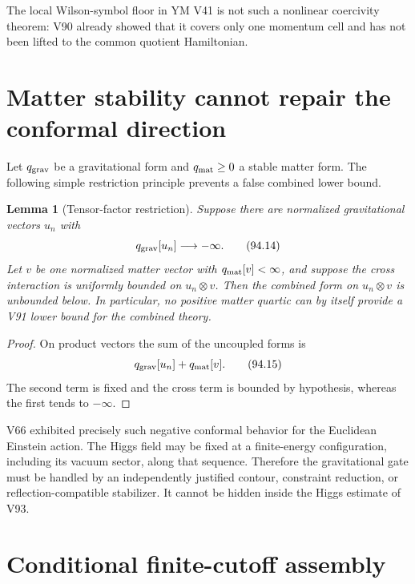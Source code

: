 \documentclass[11pt]{article}
\newtheorem{lemma}[theorem]{Lemma}
\theoremstyle{remark}
\begin{document}
The local Wilson-symbol floor in YM V41 is not such a nonlinear
coercivity theorem: V90 already showed that it covers only one
momentum cell and has not been lifted to the common quotient
Hamiltonian.

\section{Matter stability cannot repair the conformal direction}

Let \(q_{\rm grav}\) be a gravitational form and
\(q_{\rm mat}\geq0\) a stable matter form.  The following simple
restriction principle prevents a false combined lower bound.

\begin{lemma}[Tensor-factor restriction]
\label{lem:v15v94-tensor}
Suppose there are normalized gravitational vectors \(u_n\) with
\[
 q_{\rm grav}[u_n]\longrightarrow-\infty.             \tag{94.14}
\]
Let \(v\) be one normalized matter vector with
\(q_{\rm mat}[v]<\infty\), and suppose the cross interaction is
uniformly bounded on \(u_n\otimes v\).  Then the combined form on
\(u_n\otimes v\) is unbounded below.  In particular, no positive
matter quartic can by itself provide a V91 lower bound for the
combined theory.
\end{lemma}

\begin{proof}
On product vectors the sum of the uncoupled forms is
\[
 q_{\rm grav}[u_n]+q_{\rm mat}[v].                    \tag{94.15}
\]
The second term is fixed and the cross term is bounded by
hypothesis, whereas the first tends to \(-\infty\).
\end{proof}

V66 exhibited precisely such negative conformal behavior for the
Euclidean Einstein action.  The Higgs field may be fixed at a
finite-energy configuration, including its vacuum sector, along
that sequence.  Therefore the gravitational gate must be handled
by an independently justified contour, constraint reduction, or
reflection-compatible stabilizer.  It cannot be hidden inside the
Higgs estimate of V93.

\section{Conditional finite-cutoff assembly}
\end{document}
